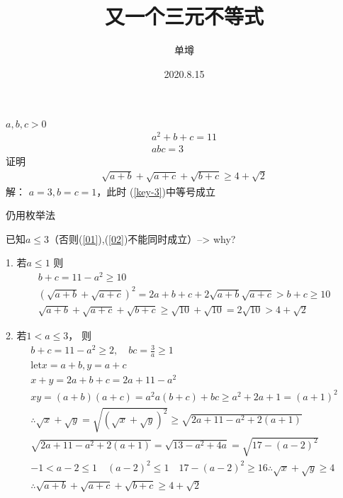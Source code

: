\documentclass[10pt,a4paper]{book}
\title{又一个三元不等式}
\author{单墫}
\date{2020.8.15}
\begin{document}
	\maketitle
$ a,b,c > 0 $
\begin{gather}
	a^2+b+c=11 \label{01}\\
	abc=3\label{02}
\end{gather}
	证明
	\begin{gather}
		\sqrt{a+b}+\sqrt{a+c}+\sqrt{b+c} \ge 4+\sqrt{2}
		\label{key-3}
	\end{gather}
解： $ a=3,b=c=1 $，此时 (\ref{key-3})中等号成立

仍用枚举法

已知$ a\le 3 $（否则(\ref{01}),(\ref{02})不能同时成立）--> why?

1. 若$ a\le 1 $ 则
\begin{gather}
	b+c = 11 - a^2 \ge 10\\
	(\sqrt{a+b}+\sqrt{a+c})^2 =2a+b+c+2\sqrt{a+b}\sqrt{a+c}>b+c \ge 10 \\
	\sqrt{a+b} + \sqrt{a+c}+\sqrt{b+c}\ge \sqrt{10}+\sqrt{10} = 2\sqrt{10}>4+\sqrt{2}
\end{gather}

2. 若$ 1<a\le 3 $， 则
\begin{gather}
	b+c = 11-a^2 \ge 2, \quad  bc = \frac{3}{a}\ge 1\\
	\text{let} x=a+b, y=a+c\\
	x+y = 2a+b+c = 2a+11-a^2\\
	xy = (a+b)(a+c)=a^2a(b+c)+bc
	\ge a^2+2a+1 = (a+1)^2\\
	\therefore \sqrt{x}+\sqrt{y} = \sqrt{(\sqrt{x}+\sqrt{y})^2}\ge \sqrt{2a+11-a^2+2(a+1)}\\
	\sqrt{2a+11-a^2+2(a+1)} = \sqrt{13-a^2+4a} = \sqrt{17-(a-2)^2}\\
	-1<a-2\le 1\quad (a-2)^2 \le 1 \quad 17-(a-2)^2 \ge 16 \therefore \sqrt{x}+\sqrt{y}\ge 4\\
	\therefore 	\sqrt{a+b}+\sqrt{a+c}+\sqrt{b+c} \ge 4+\sqrt{2}
\end{gather}
\end{document}
